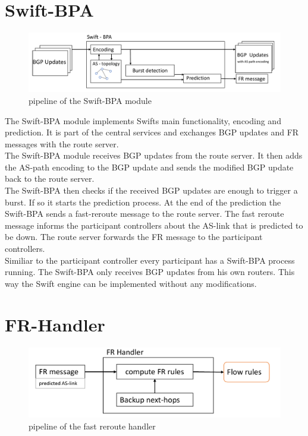\section{\label{chapter3:Swift-BPA}Swift-BPA}

\begin{figure}[h]
\center
\includegraphics[scale = 0.5]{Figures/design_swift_bpa_cropped.pdf}
\caption{pipeline of the Swift-BPA module}
\end{figure}

The Swift-BPA module implements Swifts main functionality, encoding and prediction. It is part of the central services and exchanges BGP updates and FR messages with the route server. \\
The Swift-BPA module receives BGP updates from the route server. It then adds the AS-path encoding to the BGP update and sends the modified BGP update back to the route server. \\
The Swift-BPA then checks if the received BGP updates are enough to trigger a burst. If so it starts the prediction process. At the end of the prediction the Swift-BPA sends a fast-reroute message to the route server. The fast reroute message informs the participant controllers about the AS-link that is predicted to be down. The route server forwards the FR message to the participant controllers. \\
Similiar to the participant controller every participant has a Swift-BPA process running. The Swift-BPA only receives BGP updates from his own routers. This way the Swift engine can be implemented without any modifications.

\section{\label{chapter3:FR-handler}FR-Handler}

\begin{figure}[h]
\center
\includegraphics[scale = 0.6]{Figures/design_fr_handler_cropped.pdf}
\caption{pipeline of the fast reroute handler}
\end{figure}

